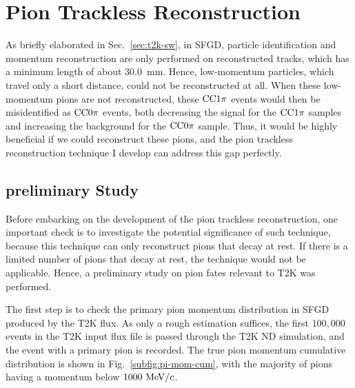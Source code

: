    \section{Pion Trackless Reconstruction}
       As briefly elaborated in Sec.~\ref{sec:t2k-sw}, in SFGD, particle identification and momentum reconstruction are only performed on reconstructed tracks, which has a minimum length of about $30.0$~mm. 
       Hence, low-momentum particles, which travel only a short distance, could not be reconstructed at all. 
       When these low-momentum pions are not reconstructed, these $\textrm{CC}1\pi$ events would then be misidentified as $\textrm{CC}0\pi$ events, both decreasing the signal for the $\textrm{CC}1\pi$ samples and increasing the background for the $\textrm{CC}0\pi$ sample. 
       Thus, it would be highly beneficial if we could reconstruct these pions, and the pion trackless reconstruction technique I develop can address this gap perfectly. 
     
       \subsection{preliminary Study}
       \label{sec:tl-ps}
         Before embarking on the development of the pion trackless reconstruction, one important check is to investigate the potential significance of such technique, because this technique can only reconstruct pions that decay at rest.
         If there is a limited number of pions that decay at rest, the technique would not be applicable.
         Hence, a preliminary study on pion fates relevant to T2K was performed.

         The first step is to check the primary pion momentum distribution in SFGD produced by the T2K flux.
         As only a rough estimation suffices, the first $100,000$ events in the T2K input flux file is passed through the T2K ND simulation, and the event with a primary pion is recorded.
         The true pion momentum cumulative distribution is shown in Fig.~\ref{subfig:pi-mom-cum}, with the majority of pions having a momentum below $1000~\textrm{MeV}/c$.


